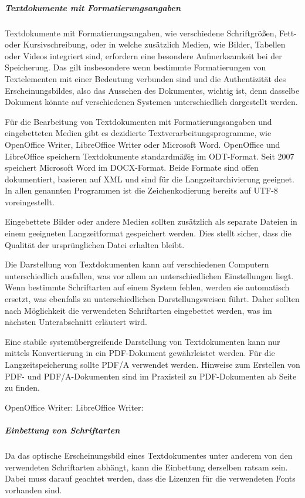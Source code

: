 \subparagraph{Textdokumente mit Formatierungsangaben} Textdokumente mit Formatierungsangaben, wie verschiedene Schriftgrößen, Fett- oder Kursivschreibung, oder in welche zusätzlich Medien, wie Bilder, Tabellen oder Videos integriert sind, erfordern eine besondere Aufmerksamkeit bei der Speicherung. Das gilt insbesondere wenn bestimmte Formatierungen von Textelementen mit einer Bedeutung verbunden sind und die Authentizität des Erscheinungsbildes, also das Aussehen des Dokumentes, wichtig ist, denn dasselbe Dokument könnte auf verschiedenen Systemen unterschiedlich dargestellt werden.  

Für die Bearbeitung von Textdokumenten mit Formatierungsangaben und eingebetteten Medien gibt es dezidierte Textverarbeitungsprogramme, wie OpenOffice Writer, LibreOffice Writer oder Microsoft Word. OpenOffice und LibreOffice speichern Textdokumente standardmäßig im ODT-Format. Seit 2007 speichert Microsoft Word im DOCX-Format. Beide Formate sind offen dokumentiert, basieren auf XML und sind für die Langzeitarchivierung geeignet. In allen genannten Programmen ist die Zeichenkodierung bereits auf UTF-8 voreingestellt.

Eingebettete Bilder oder andere Medien sollten zusätzlich als separate Dateien in einem geeigneten Langzeitformat gespeichert werden. Dies stellt sicher, dass die Qualität der ursprünglichen Datei erhalten bleibt.

Die Darstellung von Textdokumenten kann auf verschiedenen Computern unterschiedlich ausfallen, was vor allem an unterschiedlichen Einstellungen liegt. Wenn bestimmte Schriftarten auf einem System fehlen, werden sie automatisch ersetzt, was ebenfalls zu unterschiedlichen Darstellungsweisen führt. Daher sollten nach Möglichkeit die verwendeten Schriftarten eingebettet werden, was im nächsten Unterabschnitt erläutert wird.

Eine stabile systemübergreifende Darstellung von Textdokumenten kann nur mittels Konvertierung in ein PDF-Dokument gewährleistet werden. Für die Langzeitspeicherung sollte PDF/A verwendet werden. Hinweise zum Erstellen von PDF- und PDF/A-Dokumenten sind im Praxisteil zu PDF-Dokumenten ab Seite \pageref{pdf-dokumenteErstellen} zu finden.

\begin{flushleft}
	OpenOffice Writer: 
	LibreOffice Writer: 
\end{flushleft}


\subparagraph{Einbettung von Schriftarten}\label{text-fontembedding}
Da das optische Erscheinungsbild eines Textdokumentes unter anderem von den verwendeten Schriftarten abhängt, kann die Einbettung derselben ratsam sein. Dabei muss darauf geachtet werden, dass die Lizenzen für die verwendeten Fonts vorhanden sind.

